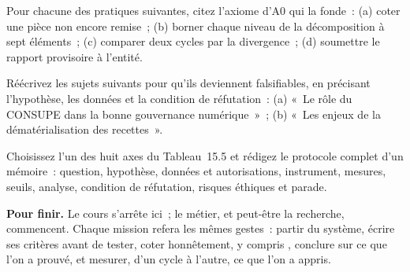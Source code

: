 \begin{boxexo}[title={\ding{45}\quad Exercice~15.1. Axiomes et pratiques \niveaubase}]
Pour chacune des pratiques suivantes, citez l'axiome d'A0 qui la fonde~:
(a) coter \NEK{} une pièce non encore remise~; (b) borner chaque niveau de
la décomposition à sept éléments~; (c) comparer deux cycles par la
divergence~; (d) soumettre le rapport provisoire à l'entité.
\end{boxexo}

\begin{boxexo}[title={\ding{45}\quad Exercice~15.2. Rendre un sujet falsifiable \niveaumoyen}]
Réécrivez les sujets suivants pour qu'ils deviennent falsifiables, en
précisant l'hypothèse, les données et la condition de réfutation~: (a)
«~Le rôle du CONSUPE dans la bonne gouvernance numérique~»~; (b) «~Les
enjeux de la dématérialisation des recettes~».
\end{boxexo}

\begin{boxexo}[title={\ding{45}\quad Exercice~15.3. Un protocole \niveauexpert}]
Choisissez l'un des huit axes du Tableau~15.5 et rédigez le protocole
complet d'un mémoire~: question, hypothèse, données et autorisations,
instrument, mesures, seuils, analyse, condition de réfutation, risques
éthiques et parade.
\end{boxexo}

\begin{boxinfo}
\textbf{Pour finir.} Le cours s'arrête ici~; le métier, et peut-être la
recherche, commencent. Chaque mission refera les mêmes gestes~: partir du
système, écrire ses critères avant de tester, coter honnêtement, y compris
\NEK{}, conclure sur ce que l'on a prouvé, et mesurer, d'un cycle à
l'autre, ce que l'on a appris.
\end{boxinfo}
